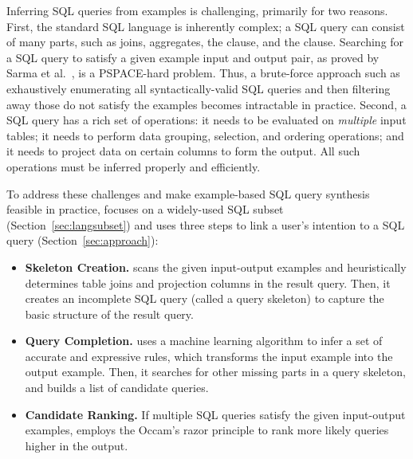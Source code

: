 Inferring SQL queries from examples is challenging,
primarily for two reasons. First, the standard SQL
language is inherently complex; a SQL query can consist
of many parts, such as joins, aggregates,
the  clause, and the  clause.
Searching for a SQL query
to satisfy a given example input and output pair,
as proved by Sarma et al.~\cite{DasSarma:2010},
is a PSPACE-hard problem. Thus,
a brute-force approach such as exhaustively
enumerating all
syntactically-valid SQL queries and then
filtering away those do not satisfy the examples
becomes intractable in practice. 
Second, a SQL query has a rich set of operations: it
needs to be evaluated on \textit{multiple} input tables;
it needs to perform data grouping, selection, and ordering
operations; and it needs to project data on certain columns to
form the output.
All such operations must be inferred properly and efficiently.%


To address these challenges and make example-based
SQL query synthesis feasible in practice,
\ourtool focuses on a widely-used SQL subset (Section~\ref{sec:langsubset})
and uses three steps to link a user's intention to
a SQL query (Section~\ref{sec:approach}):



\begin{itemize}
\vspace{-1mm}
\item \textbf{Skeleton Creation.} \ourtool scans the
given input-output examples and heuristically
determines table joins and projection columns in
the result query. Then, it creates an
incomplete SQL query (called a query skeleton) to
capture the basic structure of the result query.

\item \textbf{Query Completion.} \ourtool
uses a machine learning algorithm to infer a set of accurate
and expressive rules, which transforms the input
example into the output example. Then, it
searches for other missing parts in a query skeleton,
and builds a list of candidate queries. 


\item \textbf{Candidate Ranking.} If multiple SQL
queries satisfy the given input-output examples,
\ourtool employs the Occam's razor principle to
rank more likely queries higher in the output.
\end{itemize}

